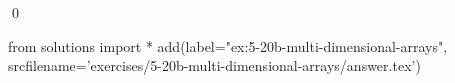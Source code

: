
\begin{ex} 
  \label{ex:5-20b-multi-dimensional-arrays}
  
  \qed
\end{ex} 
\begin{python0}
from solutions import *
add(label="ex:5-20b-multi-dimensional-arrays",
    srcfilename='exercises/5-20b-multi-dimensional-arrays/answer.tex') 
\end{python0}
